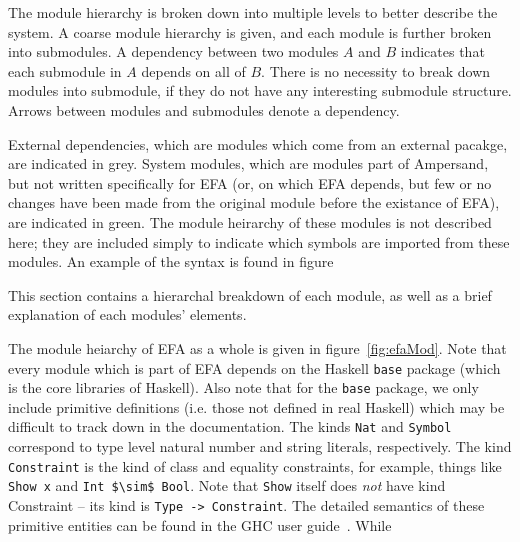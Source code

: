 The module hierarchy is broken down into multiple levels to better describe the
system.  A coarse module hierarchy is given, and each module is further broken
into submodules.  A dependency between two modules $A$ and $B$ indicates that
each submodule in $A$ depends on all of $B$. There is no necessity to break
down modules into submodule, if they do not have any interesting submodule 
structure. Arrows between modules and submodules denote a dependency. 

External dependencies, which are modules which come from an external pacakge,
are indicated in {\color{grey}grey}. System modules, which are modules part of
Ampersand, but not written specifically for EFA (or, on which EFA depends, but
few or no changes have been made from the original module before the existance
of EFA), are indicated in {\color{applegreen}green}. The module heirarchy of
these modules is not described here; they are included simply to indicate which
symbols are imported from these modules. An example of the syntax is found in
figure%

This section contains a hierarchal breakdown of each module, as well as a brief
explanation of each modules' elements. 

The module heiarchy of EFA as a whole is given in figure~\ref{fig:efaMod}.  Note
that every module which is part of EFA depends on the Haskell \texttt{base} 
package
(which is the core libraries of Haskell). Also note that for the \texttt{base}
package, we only include primitive definitions (i.e. those not defined in real
Haskell) which may be difficult to track down in the documentation. The kinds
\lstinline{Nat} and \lstinline{Symbol} correspond to type level natural number 
and string
literals, respectively. The kind \lstinline{Constraint} is the kind of class and
equality constraints, for example, things like \lstinline{Show x} and 
\lstinline[mathescape]|Int $\sim$ Bool|.  
Note that \texttt{Show} itself does \emph{not} have kind Constraint --
its kind is \lstinline{Type -> Constraint}. The detailed semantics of these
primitive entities can be found in the GHC user guide~\cite{ghcUserGuide}. While


